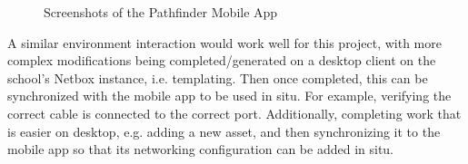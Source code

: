 \documentclass [11pt,a4paper]{article}
\begin{document}
\begin{figure}[H]%
    \centering
    \qquad
    \caption{Screenshots of the Pathfinder Mobile App}%
    \label{fig:pathfinder_screenshots}%
\end{figure}

A similar environment interaction would work well for this project, with more complex modifications being completed/generated on a desktop client on the school's Netbox instance, i.e. templating. Then once completed, this can be synchronized with the mobile app to be used in situ. For example, verifying the correct cable is connected to the correct port. Additionally, completing work that is easier on desktop, e.g. adding a new asset, and then synchronizing it to the mobile app so that its networking configuration can be added in situ. 
\end{document}
